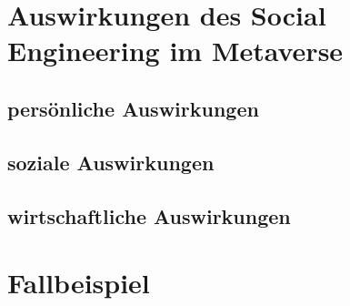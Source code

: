 \section{Auswirkungen des Social Engineering im Metaverse}

\subsection{persönliche Auswirkungen}
\subsection{soziale Auswirkungen}
\subsection{wirtschaftliche Auswirkungen}

\section{Fallbeispiel}